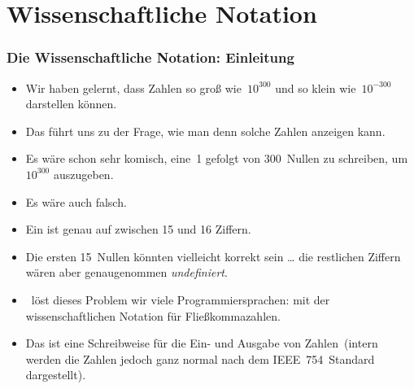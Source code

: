 \documentclass[aspectratio=169,mathserif,notheorems]{beamer}%
\begin{document}
\section{Wissenschaftliche Notation}%
%
\begin{frame}%
\frametitle{Die Wissenschaftliche Notation: Einleitung}%
\begin{itemize}%
\item Wir haben gelernt, dass  Zahlen so groß wie~$10^{300}$ und so klein wie~$10^{-300}$ darstellen können.%
\item<2-> Das führt uns zu der Frage, wie man denn solche Zahlen anzeigen kann.%
\item<3-> Es wäre schon sehr komisch, eine~1 gefolgt von 300~Nullen zu schreiben, um~$10^{300}$ auszugeben.%
\item<4-> Es wäre auch falsch.%
\item<5-> Ein  ist genau auf zwischen 15 und 16 Ziffern.%
\item<6-> Die ersten 15~Nullen könnten vielleicht korrekt sein {\dots} die restlichen Ziffern wären aber genaugenommen \emph{undefiniert}.
 \item<7-> \python\ löst dieses Problem wir viele Programmiersprachen: mit der wissenschaftlichen Notation für Fließkommazahlen.%
 \item<8-> Das ist eine Schreibweise für die Ein- und Ausgabe von Zahlen~(intern werden die Zahlen jedoch ganz normal nach dem IEEE~754~Standard\cite{IEEE2019ISFFPA,H1997IS7FPN} dargestellt).%
\end{itemize}%
\end{frame}%
%
\end{document}

